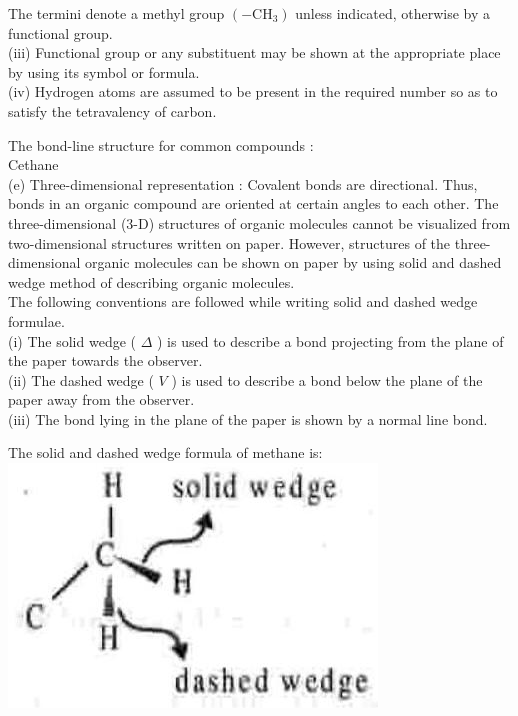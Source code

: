 \documentclass[10pt]{article}
\begin{document}
The termini denote a methyl group $\left(-\mathrm{CH}_{3}\right)$ unless indicated, otherwise by a functional group.\\
(iii) Functional group or any substituent may be shown at the appropriate place by using its symbol or formula.\\
(iv) Hydrogen atoms are assumed to be present in the required number so as to satisfy the tetravalency of carbon.

The bond-line structure for common compounds :\\
Cethane\\
(e) Three-dimensional representation : Covalent bonds are directional. Thus, bonds in an organic compound are oriented at certain angles to each other. The three-dimensional (3-D) structures of organic molecules cannot be visualized from two-dimensional structures written on paper. However, structures of the three-dimensional organic molecules can be shown on paper by using solid and dashed wedge method of describing organic molecules.\\
The following conventions are followed while writing solid and dashed wedge formulae.\\
(i) The solid wedge ( $\Delta$ ) is used to describe a bond projecting from the plane of the paper towards the observer.\\
(ii) The dashed wedge ( $V$ ) is used to describe a bond below the plane of the paper away from the observer.\\
(iii) The bond lying in the plane of the paper is shown by a normal line bond.

The solid and dashed wedge formula of methane is:\\
\includegraphics[max width=\textwidth, center]{2025_01_28_8470952b98110cec3aabg-007}
\end{document}
